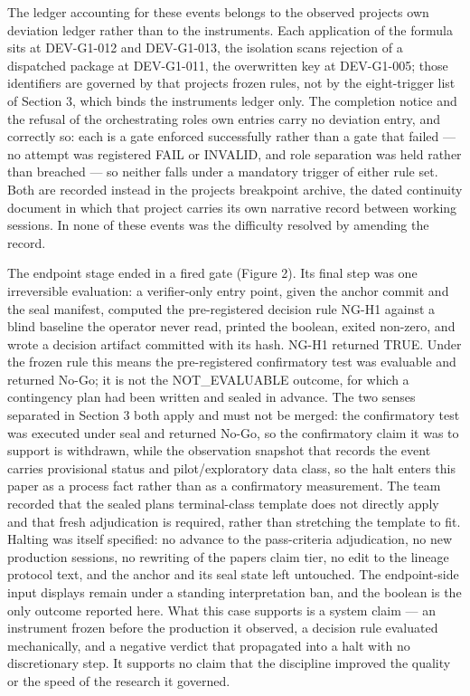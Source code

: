 \documentclass[
  english,
]{article}
\begin{document}
The ledger accounting for these events belongs to the observed project\textquotesingle s own deviation ledger rather than to the instrument\textquotesingle s. Each application of the formula sits at DEV-G1-012 and DEV-G1-013, the isolation scan\textquotesingle s rejection of a dispatched package at DEV-G1-011, the overwritten key at DEV-G1-005; those identifiers are governed by that project\textquotesingle s frozen rules, not by the eight-trigger list of Section 3, which binds the instrument\textquotesingle s ledger only. The completion notice and the refusal of the orchestrating role\textquotesingle s own entries carry no deviation entry, and correctly so: each is a gate enforced successfully rather than a gate that failed --- no attempt was registered FAIL or INVALID, and role separation was held rather than breached --- so neither falls under a mandatory trigger of either rule set. Both are recorded instead in the project\textquotesingle s breakpoint archive, the dated continuity document in which that project carries its own narrative record between working sessions. In none of these events was the difficulty resolved by amending the record.

The endpoint stage ended in a fired gate (Figure 2). Its final step was one irreversible evaluation: a verifier-only entry point, given the anchor commit and the seal manifest, computed the pre-registered decision rule NG-H1 against a blind baseline the operator never read, printed the boolean, exited non-zero, and wrote a decision artifact committed with its hash. NG-H1 returned TRUE. Under the frozen rule this means the pre-registered confirmatory test was evaluable and returned No-Go; it is not the NOT\_EVALUABLE outcome, for which a contingency plan had been written and sealed in advance. The two senses separated in Section 3 both apply and must not be merged: the confirmatory test was executed under seal and returned No-Go, so the confirmatory claim it was to support is withdrawn, while the observation snapshot that records the event carries provisional status and pilot/exploratory data class, so the halt enters this paper as a process fact rather than as a confirmatory measurement. The team recorded that the sealed plan\textquotesingle s terminal-class template does not directly apply and that fresh adjudication is required, rather than stretching the template to fit. Halting was itself specified: no advance to the pass-criteria adjudication, no new production sessions, no rewriting of the paper\textquotesingle s claim tier, no edit to the lineage protocol text, and the anchor and its seal state left untouched. The endpoint-side input displays remain under a standing interpretation ban, and the boolean is the only outcome reported here. What this case supports is a system claim --- an instrument frozen before the production it observed, a decision rule evaluated mechanically, and a negative verdict that propagated into a halt with no discretionary step. It supports no claim that the discipline improved the quality or the speed of the research it governed.
\end{document}
